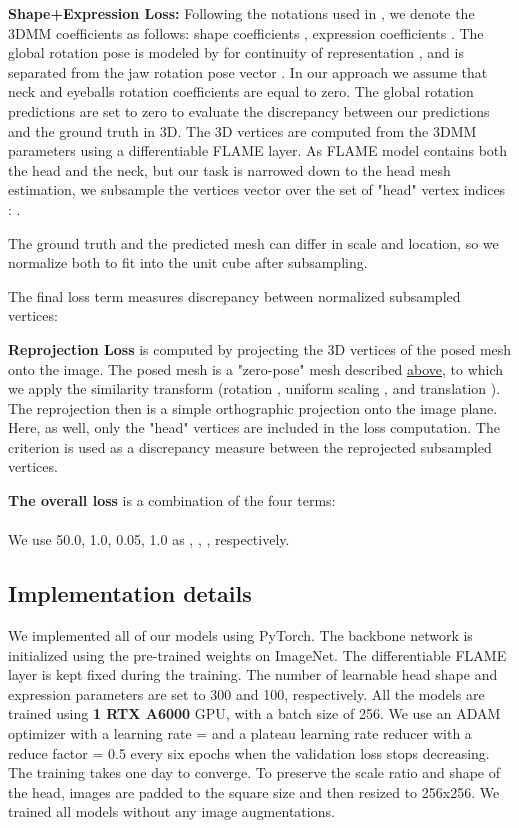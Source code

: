 \documentclass[10pt,twocolumn,letterpaper]{article}
\begin{document}
\textbf{Shape+Expression Loss:}\label{shapeLoss} Following the notations used in \cite{RingNet} , we denote the 3DMM coefficients as follows: shape coefficients , expression coefficients . 
The global rotation pose is modeled by  for continuity of representation \cite{continuity_rotation}, and is separated from the jaw rotation pose vector . 
In our approach we assume that neck  and eyeballs  rotation coefficients are equal to zero.
The global rotation predictions are set to zero to evaluate the discrepancy between our predictions and the ground truth in 3D. 
The 3D vertices are computed from the 3DMM parameters using a differentiable FLAME layer.
As FLAME model \cite{FLAME} contains both the head and the neck, but our task is narrowed down to the head mesh estimation, we subsample the vertices vector  over the set of "head" vertex indices : .


The ground truth and the predicted mesh can differ in scale and location, so we normalize 
both to fit into the unit cube after subsampling.

The final loss term measures discrepancy between normalized subsampled vertices:

\textbf{Reprojection Loss} is computed by projecting the 3D vertices of the posed mesh onto the image. 
The posed mesh is a "zero-pose" mesh described \hyperref[shapeLoss]{above}, to which we apply the similarity transform (rotation , uniform scaling , and translation ). 
The reprojection then is a simple orthographic projection onto the image plane. Here, as well, only the "head" vertices are included in the loss computation. 
The  criterion is used as a discrepancy measure between the reprojected subsampled vertices. 

\textbf{The overall loss} is a combination of the four terms:\\
\\
We use 50.0, 1.0, 0.05, 1.0 as , , ,  respectively. 











\subsection{Implementation details}
We implemented all of our models using PyTorch. The backbone network is initialized using the pre-trained weights on ImageNet. The differentiable FLAME layer is kept fixed during the training. The number of learnable head shape and expression parameters are set to 300 and 100, respectively. All the models are trained using \textbf{1 RTX A6000} GPU, with a batch size of 256. We use an ADAM optimizer with a learning rate =  and a plateau learning rate reducer with a reduce factor = 0.5 every six epochs when the validation loss stops decreasing. The training takes one day to converge. To preserve the scale ratio and shape of the head, images are padded to the square size and then resized to 256x256. We trained all models without any image augmentations. 
\end{document}
